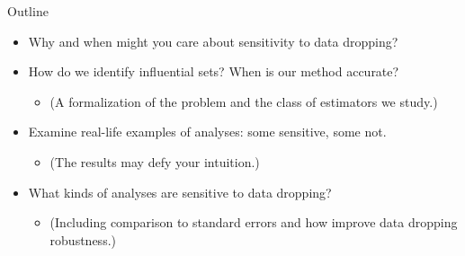 

\begin{frame}{Outline}
\begin{itemize}
    \item Why and when might you care about sensitivity to data dropping?
    \item How do we identify influential sets?  When is our method accurate?
    \begin{itemize}
        \item[] (A formalization of the problem and the
            class of estimators we study.)
    \end{itemize}
    \item Examine real-life examples of analyses: some sensitive, some not.
    \begin{itemize}
        \item[] (The results may defy your intuition.)
    \end{itemize}
    \item What kinds of analyses are sensitive to data dropping?
    \begin{itemize}
        \item[] (Including comparison to standard errors and how
                 improve data dropping robustness.)
    \end{itemize}
\end{itemize}
\end{frame}


